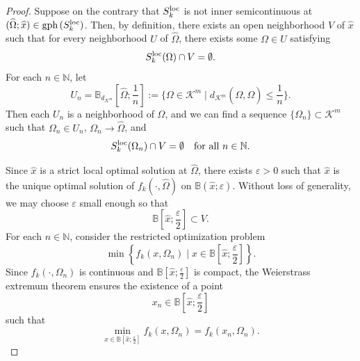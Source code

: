 \documentclass[sn-mathphys-num]{sn-jnl}%
\def\Hat{\widehat}
\def\gph{\mbox{\rm gph}\,}
\theoremstyle{definition}
\begin{document}
\begin{proof}
	Suppose on the contrary that $S_k^{{\rm loc}}$ is not inner semicontinuous at $(\Hat\Omega;\Hat{x})\in \gph(S_k^{{\rm loc}})$. Then, by definition, there exists an open neighborhood $V$ of $\Hat{x}$ such that for every neighborhood $U$ of $\Hat\Omega$, there exists some $\Omega\in U$ satisfying
	\[
	S_k^{{\rm loc}}(\Omega)\cap V=\emptyset.
	\]
	For each $n\in\mathbb N$, let
	\[
	U_n=\mathbb{B}_{d_{\mathcal{K}^m}}\left[\Hat\Omega;\frac{1}{n}\right]:=\biggr\{ \Omega\in \mathcal{K}^m\mid d_{\mathcal{K}^m}(\Omega,\Hat\Omega)\leq\frac{1}{n}\biggl\}.
	\]
	Then each $U_n$ is a neighborhood of $\Hat\Omega$, and we can find a sequence $\{\Omega_n\}\subset \mathcal{K}^m$ such that $\Omega_n\in U_n$, $\Omega_n\to \Hat\Omega$, and
	\begin{equation}
		\label{L.S.Mapping_2_1}
		S_k^{{\rm loc}}(\Omega_n)\cap V=\emptyset
		\quad \text{for all } n\in\mathbb N.
	\end{equation}
	
	Since $\Hat x$ is a strict local optimal solution at $\Hat\Omega$, there exists $\varepsilon>0$ such that $\Hat x$ is the unique optimal solution of $f_k(\cdot,\Hat\Omega)$ on $\mathbb B\left(\Hat x;\varepsilon\right)$. Without loss of generality, we may choose $\varepsilon$ small enough so that
	\[
	\mathbb B\left[\Hat x;\frac{\varepsilon}{2}\right]\subset V.
	\]
	For each $n\in\mathbb N$, consider the restricted optimization problem
	\[
	\min\left\{f_k(x,\Omega_n)\mid x\in\mathbb B\left[\Hat x;\frac{\varepsilon}{2}\right]\right\}.
	\]
	Since $f_k(\cdot,\Omega_n)$ is continuous and $\mathbb B\left[\Hat x;\frac{\varepsilon}{2}\right]$ is compact, the Weierstrass extremum theorem ensures the existence of a point
	\[
	x_n\in \mathbb B\left[\Hat x;\frac{\varepsilon}{2}\right]
	\]
	such that
	\begin{equation}
		\label{L.S.Mapping_2_2}
		\min_{x\in\mathbb B\left[\Hat x;\frac{\varepsilon}{2}\right]}f_k(x,\Omega_n)
		=
		f_k(x_n,\Omega_n).
	\end{equation}
	

\end{proof}
\end{document}
